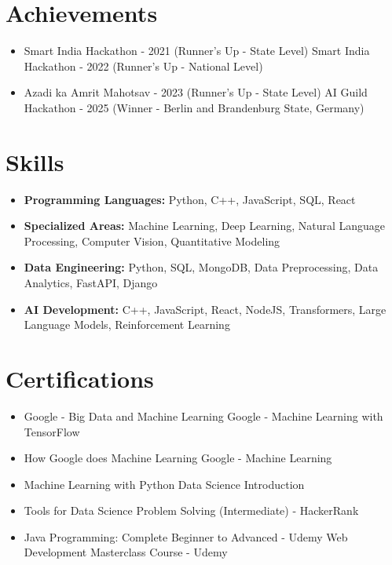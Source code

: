 \documentclass[a4paper,10pt]{article}
\begin{document}
\section*{Achievements}
\begin{itemize}
\item Smart India Hackathon - 2021 (Runner's Up - State Level) \hfill Smart India Hackathon - 2022 (Runner's Up - National Level)
\item Azadi ka Amrit Mahotsav - 2023 (Runner's Up - State Level) \hfill AI Guild Hackathon - 2025 (Winner - Berlin and Brandenburg State, Germany)
\end{itemize}

\section*{Skills}
\begin{itemize}
  \item \textbf{Programming Languages:} Python, C++, JavaScript, SQL, React
  \item \textbf{Specialized Areas:} Machine Learning, Deep Learning, Natural Language Processing, Computer Vision, Quantitative Modeling
  \item \textbf{Data Engineering:} Python, SQL, MongoDB, Data Preprocessing, Data Analytics, FastAPI, Django
  \item \textbf{AI Development:} C++, JavaScript, React, NodeJS, Transformers, Large Language Models, Reinforcement Learning
\end{itemize}

\section*{Certifications}
\begin{itemize}
\item Google - Big Data and Machine Learning \hfill Google - Machine Learning with TensorFlow
\item How Google does Machine Learning \hfill Google - Machine Learning
\item Machine Learning with Python \hfill Data Science Introduction
\item Tools for Data Science \hfill Problem Solving (Intermediate) - HackerRank
\item Java Programming: Complete Beginner to Advanced - Udemy \hfill Web Development Masterclass Course - Udemy
\end{itemize}
\end{document}
